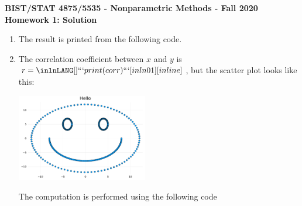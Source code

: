 \documentclass[11pt]{article}
\begin{document}
\begin{center}\large \bf
  BIST/STAT 4875/5535 - Nonparametric Methods -  Fall 2020 \\
  Homework 1: Solution \\
\end{center}

\begin{enumerate}
\item {}
  The result
  is printed from the following code.
  
\item {}
  The correlation coefficient between $x$ and $y$ is $r=\inlnJulia{```print(corr)```}[inln01]$, but the scatter plot looks like this:
  \begin{center}
    \includegraphics[width=0.45\textwidth]{face.pdf}
  \end{center}
  The computation is performed using the following code
\end{enumerate}
\end{document}
